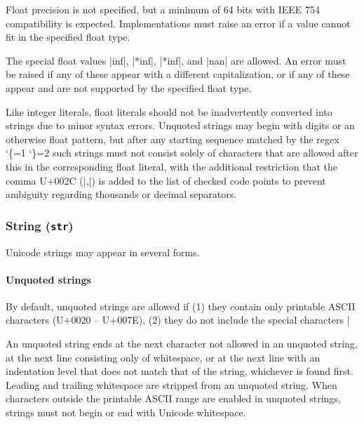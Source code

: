 \documentclass[11pt]{article}
\makeatletter
\newcommand{\lit}{%
  \begingroup
  \let\do\@makeother
  \dospecials
  \catcode`\{=1
  \catcode`\}=2
  \lit@i}
\def\lit@i#1{%
  \endgroup
  \texttt{\color{DarkRed}\detokenize{#1}}}
\makeatother
\begin{document}
Float precision is not specified, but a minimum of 64 bits with IEEE 754 compatibility is expected.  Implementations must raise an error if a value cannot fit in the specified float type.

The special float values |inf|, |\+[\x20\t]*inf|, |\-[\x20\t]*inf|, and |nan| are allowed.  An error must be raised if any of these appear with a different capitalization, or if any of these appear and are not supported by the specified float type.

Like integer literals, float literals should not be inadvertently converted into strings due to minor syntax errors.  Unquoted strings may begin with digits or an otherwise float pattern, but after any starting sequence matched by the regex \lit{[+-]?[\x20\t]*(?:0x|[.0-9])} such strings must not consist solely of characters that are allowed after this in the corresponding float literal, with the additional restriction that the comma U+002C (|,|) is added to the list of checked code points to prevent ambiguity regarding thousands or decimal separators.


\subsubsection{String (\texttt{str})}

Unicode strings may appear in several forms.

\paragraph{Unquoted strings}

By default, unquoted strings are allowed if (1) they contain only printable ASCII characters (U+0020 -- U+007E), (2) they do not include the special characters |%

An unquoted string ends at the next character not allowed in an unquoted string, at the next line consisting only of whitespace, or at the next line with an indentation level that does not match that of the string, whichever is found first.  Leading and trailing whitespace are stripped from an unquoted string.  When characters outside the printable ASCII range are enabled in unquoted strings, strings must not begin or end with Unicode whitespace.
\end{document}
